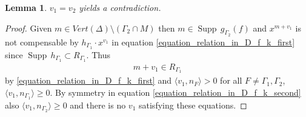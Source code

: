 \documentclass[10pt,a4paper]{amsart}
\newtheorem{lemma}{Lemma}
\DeclareMathOperator{\Supp}{Supp}
\begin{document}
\begin{lemma}
	$v_1 = v_2$ yields a contradiction.
\end{lemma}

\begin{proof}
	Given $m \in Vert(\Delta) \setminus (\Gamma_2 \cap M)$ then $m \in \Supp \, g_{\Gamma_2}(f)$ and $x^{m+v_1}$ is not compensable by $h_{\Gamma_1} \cdot x^{v_1}$ in equation \ref{equation_relation_in_D_f_k_first} since $\Supp \, h_{\Gamma_1} \subset R_{\Gamma_1}$. Thus 
	\begin{align*}
		m + v_1 \in R_{\Gamma_1}
	\end{align*}
	by \ref{equation_relation_in_D_f_k_first} and $\langle v_1,n_F \rangle > 0$ for all $F \neq \Gamma_1, \Gamma_2$, $\langle v_1,n_{\Gamma_1} \rangle \geq 0$. By symmetry in equation \ref{equation_relation_in_D_f_k_second} also $\langle v_1,n_{\Gamma_2} \rangle \geq 0$ and there is no $v_1$ satisfying these equations.
\end{proof}
\end{document}
